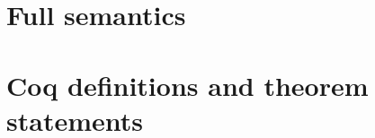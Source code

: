 \documentclass[12pt,twoside,notitlepage]{report}
\theoremstyle{plain}%
\theoremstyle{definition}
\theoremstyle{remark}
\begin{document}
\cleardoublepage



\cleardoublepage

\appendix

\chapter{Full semantics}
\ottall
\label{chap:fullsemantics}









\chapter{Coq definitions and theorem statements}
\label{cha:full_proof_statements}
\end{document}
